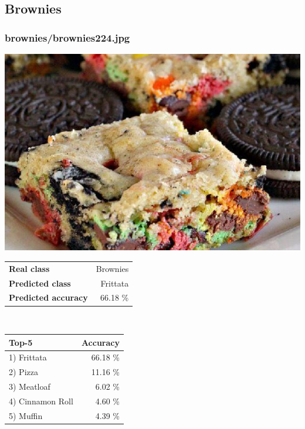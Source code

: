 \subsection{Brownies}
    
\subsubsection{brownies/brownies224.jpg}

\begin{minipage}[t]{0.4\textwidth}
	\vspace{0pt}
	\includegraphics[width=\linewidth]{images/evaluation-images/brownies/brownies224.jpg}
\end{minipage}
\hfill
\begin{minipage}[t]{0.5\textwidth}
	\vspace{0pt}\raggedright
	\begin{tabularx}{\textwidth}{X r}
		\small \textbf{Real class} & \small Brownies\\
		\small \textbf{Predicted class} & \small Frittata\\
		\small \textbf{Predicted accuracy} & \small 66.18 \%
    \end{tabularx}\\
    
    \vspace{6pt}
	\begin{tabularx}{\textwidth}{X r}
        \small \textbf{Top-5} & \small \textbf{Accuracy} \\
        \hline
		\small 1) Frittata & \small 66.18 \%\\\small 2) Pizza & \small 11.16 \%\\\small 3) Meatloaf & \small 6.02 \%\\\small 4) Cinnamon Roll & \small 4.60 \%\\\small 5) Muffin & \small 4.39 \%
    \end{tabularx}
\end{minipage}
    

